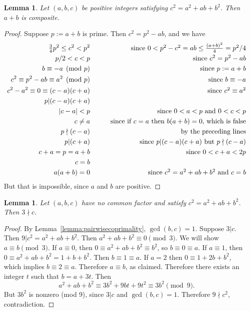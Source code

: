\documentclass{amsart}
\theoremstyle{plain}
\newtheorem{lemma}[theorem]{Lemma}
\theoremstyle{definition}
\theoremstyle{remark}
\begin{document}
\begin{lemma} \label{lemma:claude4} Let  $(a,b,c)$ be positive integers
satisfying $c^2 = a^2 + ab + b^2$.  Then $a+b$ is composite.
\end{lemma}

\begin{proof}  Suppose $p := a+b$ is prime.  Then 
$c^2 = p^2 - ab$, and  we have
\begin{eqnarray*}
\tfrac 3 4 p^2 \le c^2 < p^2   &&  \mbox{\qquad since 
$0< p^2-c^2 = ab \le \frac {(a+b)^2} 4 = p^2/4$}\\
p/2 < c < p &&   \mbox{\qquad since $c^2 = p^2-ab$}\\
b \equiv -a \pmod p   &&\mbox{\qquad since $p:= a+b$}\\
c^2 \equiv p^2-ab \equiv a^2 \pmod p && \mbox{\qquad since $b \equiv -a$} \\
c^2 - a^2 \equiv 0 \equiv (c-a)(c+a)  && \mbox{\qquad since $c^2 \equiv a^2$}\\
p | (c-a)(c+a)  && \\
|c-a| < p  &&  \mbox{\qquad since $0 < a < p$ and $0 < c < p$} \\
c\neq a && \mbox{\qquad since if $c=a$ then $b(a+b)=0$, which is false}\\
p \nmid (c-a)  && \mbox{\qquad by the preceding lines}\\
p | (c+a)     && \mbox{\qquad since $ p | (c-a)(c+a)$ but $p \nmid (c-a)$}\\
c+a = p = a+b   && \mbox{\qquad since $0 < c+a < 2p$}\\
c = b    && \\
a(a+b) = 0  && \mbox{\qquad since $c^2 = a^2 + ab + b^2$ and $c=b$} 
\end{eqnarray*}
But that is impossible, since $a$ and $b$ are positive.
\end{proof}

\begin{lemma} \label{lemma:not3divc} Let $(a,b,c)$ have no common factor
and satisfy $c^2 = a^2 + ab + b^2$.  Then $3 \nmid c$.
\end{lemma}

\begin{proof}
By Lemma~\ref{lemma:pairwisecoprimality}, $\gcd(b,c) = 1$. 
Suppose $3 | c$. Then $9 | c^2 = a^2 + ab+b^2$.   Then $a^2 + ab + b^2 \equiv 0 \pmod 3$.
We will show $ a \equiv b \pmod 3$.  If $a \equiv 0$, then $0 \equiv a^2 + ab + b^2 \equiv b^2$, so $b \equiv 0 \equiv a$.
If $a \equiv 1$, then $0 \equiv a^2 + ab + b^2 = 1+ b + b^2$.  Then $b \equiv 1 \equiv a$.  If $a=2$ then 
$0 \equiv 1 + 2b + b^2$, which implies $b \equiv 2 \equiv a$.  Therefore $a \equiv b$, as claimed.   Therefore
there exists an integer $t$ such that $b = a + 3 t$.   Then 
$$ a^2 + ab + b^2 \equiv 3 b^2 + 9 bt + 9 t^2  \equiv 3b^2 \pmod 9.$$
But $3b^2$ is nonzero (mod 9), since $3 | c$ and $\gcd(b,c) = 1$. Therefore $9 \nmid c^2$, contradiction.
\end{proof}
\end{document}
